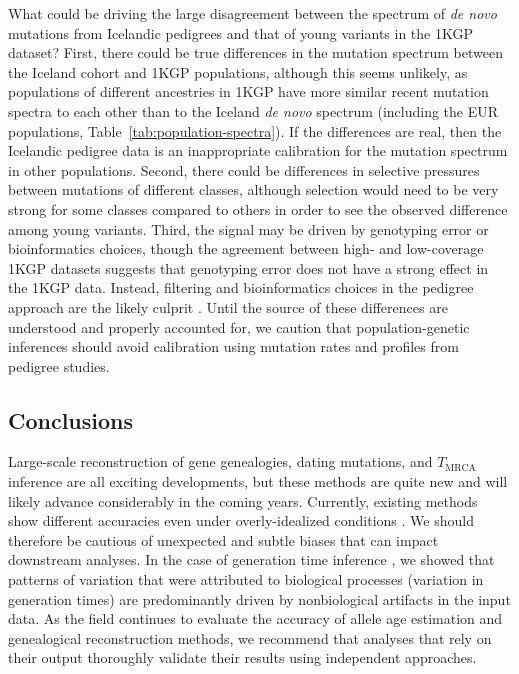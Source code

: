 \documentclass[]{article}
\begin{document}
What could be driving the large disagreement between the spectrum of \emph{de
novo} mutations from Icelandic pedigrees and that of young variants in the 1KGP
dataset? First, there could be true differences in the mutation spectrum
between the Iceland cohort and 1KGP populations, although this seems unlikely, as
populations of different ancestries in 1KGP have more similar recent mutation
spectra to each other than to the Iceland \emph{de novo} spectrum (including
the EUR populations, Table~\ref{tab:population-spectra}). If the differences
are real, then the Icelandic pedigree data is an inappropriate calibration for
the mutation spectrum in other populations. Second, there could be differences
in selective pressures between mutations of different classes, although
selection would need to be very strong for some classes compared to others in
order to see the observed difference among young variants.  Third, the signal
may be driven by genotyping error or bioinformatics choices, though the
agreement between high- and low-coverage 1KGP datasets suggests that genotyping
error does not have a strong effect in the 1KGP data. Instead, filtering and
bioinformatics choices in the pedigree approach are the likely culprit
\citep{bergeron2022mutationathon}. Until the source of these differences are
understood and properly accounted for, we caution that
population-genetic inferences should
avoid calibration using mutation rates and profiles from pedigree studies.

\subsection*{Conclusions}

Large-scale reconstruction of gene genealogies, dating mutations, and
$T_\text{MRCA}$ inference are all exciting developments, but these methods are
quite new and will likely advance considerably in the coming years. Currently,
existing methods show different accuracies even under overly-idealized
conditions \citep{brandt2022evaluation}. We should therefore be cautious of
unexpected and subtle biases that can impact downstream analyses. In the case
of generation time inference \citep{wang2023human}, we showed that patterns of
variation that were attributed to biological processes (variation in generation
times) are predominantly driven by nonbiological artifacts in the input data.
As the field continues to evaluate the accuracy of allele age estimation and
genealogical reconstruction methods, we recommend that analyses that rely on
their output thoroughly validate their results using independent approaches.



\end{document}
